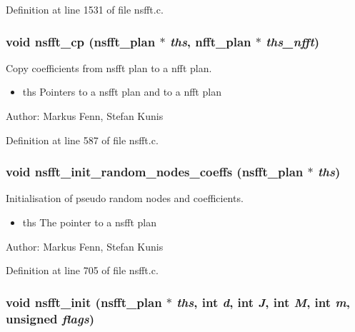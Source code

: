 Definition at line 1531 of file nsfft.c.\hypertarget{group__nsfft_ga90a04e2110e52bedb70382704f3f004}{
\subsubsection{\setlength{\rightskip}{0pt plus 5cm}void nsfft\_\-cp ({\bf nsfft\_\-plan} $\ast$ {\em ths}, {\bf nfft\_\-plan} $\ast$ {\em ths\_\-nfft})}}
\label{group__nsfft_ga90a04e2110e52bedb70382704f3f004}


Copy coefficients from nsfft plan to a nfft plan. 

\begin{itemize}
\item ths Pointers to a nsfft plan and to a nfft plan\end{itemize}
\begin{Desc}
\item[Author:]Markus Fenn, Stefan Kunis \end{Desc}


Definition at line 587 of file nsfft.c.\hypertarget{group__nsfft_g7cbc20c44eeecadc5c30f4159616f30a}{
\subsubsection{\setlength{\rightskip}{0pt plus 5cm}void nsfft\_\-init\_\-random\_\-nodes\_\-coeffs ({\bf nsfft\_\-plan} $\ast$ {\em ths})}}
\label{group__nsfft_g7cbc20c44eeecadc5c30f4159616f30a}


Initialisation of pseudo random nodes and coefficients. 

\begin{itemize}
\item ths The pointer to a nsfft plan\end{itemize}
\begin{Desc}
\item[Author:]Markus Fenn, Stefan Kunis \end{Desc}


Definition at line 705 of file nsfft.c.\hypertarget{group__nsfft_g1b7f87f960cb22420a933e915c539aaf}{
\subsubsection{\setlength{\rightskip}{0pt plus 5cm}void nsfft\_\-init ({\bf nsfft\_\-plan} $\ast$ {\em ths}, int {\em d}, int {\em J}, int {\em M}, int {\em m}, unsigned {\em flags})}}
\label{group__nsfft_g1b7f87f960cb22420a933e915c539aaf}


